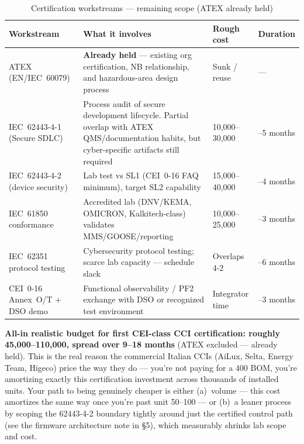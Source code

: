 \documentclass[11pt,a4paper]{article}
\begin{document}
\begin{table}[htbp]
\centering
\caption{Certification workstreams --- remaining scope (ATEX already held)}
\label{tab:cert-path}
\renewcommand{\arraystretch}{1.12}
\small
\begin{tabularx}{\linewidth}{@{}>{\raggedright\arraybackslash}p{3.1cm}>{\RaggedRight\arraybackslash}X>{\raggedright\arraybackslash}p{2.3cm}>{\raggedright\arraybackslash}p{2.3cm}@{}}
\toprule
\textbf{Workstream} & \textbf{What it involves} & \textbf{Rough cost} & \textbf{Duration} \\
\midrule
ATEX (EN/IEC~60079) &
\textbf{Already held} --- existing org certification, NB relationship, and hazardous-area design process &
Sunk / reuse &
--- \\
IEC~62443-4-1 (Secure SDLC) &
Process audit of secure development lifecycle. Partial overlap with ATEX QMS/documentation habits, but cyber-specific artifacts still required &
\EUR{}10{,}000--30{,}000 &
2--5 months \\
IEC~62443-4-2 (device security) &
Lab test vs SL1 (CEI~0-16 FAQ minimum), target SL2 capability &
\EUR{}15{,}000--40{,}000 &
2--4 months \\
IEC~61850 conformance &
Accredited lab (DNV/KEMA, OMICRON, Kalkitech-class) validates MMS/GOOSE/reporting &
\EUR{}10{,}000--25{,}000 &
1--3 months \\
IEC~62351 protocol testing &
Cybersecurity protocol testing; scarce lab capacity --- schedule slack &
Overlaps 4-2 &
3--6 months \\
CEI~0-16 Annex~O/T + DSO demo &
Functional observability / PF2 exchange with DSO or recognized test environment &
Integrator time &
1--3 months \\
\bottomrule
\end{tabularx}
\end{table}

\vspace{0.75em}
\noindent
\textbf{All-in realistic budget for first CEI-class CCI certification: roughly \EUR{}45{,}000--110{,}000, spread over 9--18 months} (ATEX excluded --- already held).
This is the real reason the commercial Italian CCIs (AiLux, Selta, Energy Team, Higeco) price the way they do --- you're not
paying for a \EUR{}400 BOM, you're amortizing exactly this certification investment across thousands of installed units.
Your path to being genuinely cheaper is either (a)~volume --- this cost amortizes the same way once you're past unit 50--100 --- or
(b)~a leaner process by scoping the 62443-4-2 boundary tightly around just the certified control path (see the firmware architecture
note in \S5), which measurably shrinks lab scope and cost.
\end{document}
